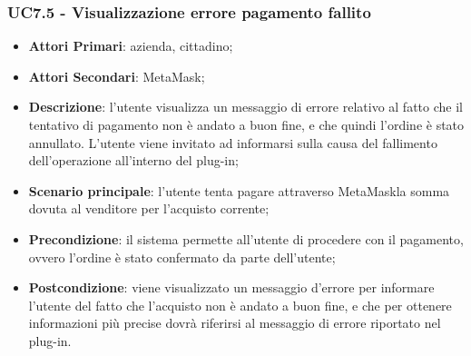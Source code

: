 \subsubsection{UC7.5 - Visualizzazione errore pagamento fallito}
\begin{itemize}
	\item \textbf{Attori Primari}: azienda, cittadino;
	\item \textbf{Attori Secondari}: MetaMask\glo;
	\item \textbf{Descrizione}:
	l'utente visualizza un messaggio di errore relativo al fatto che il tentativo di pagamento non è andato a buon fine, e che quindi l'ordine è stato annullato. L'utente viene invitato ad informarsi sulla causa del fallimento dell'operazione all'interno del plug-in;
	\item \textbf{Scenario principale}: l'utente tenta pagare attraverso MetaMask\glosp la somma dovuta al venditore per l'acquisto corrente;
	\item \textbf{Precondizione}: il sistema permette all'utente di procedere con il pagamento, ovvero l'ordine è stato confermato da parte dell'utente;
	\item \textbf{Postcondizione}: viene visualizzato un messaggio d'errore per informare l'utente del fatto che l'acquisto non è andato a buon fine, e che per ottenere informazioni più precise dovrà riferirsi al messaggio di errore riportato nel plug-in. 
\end{itemize} 






